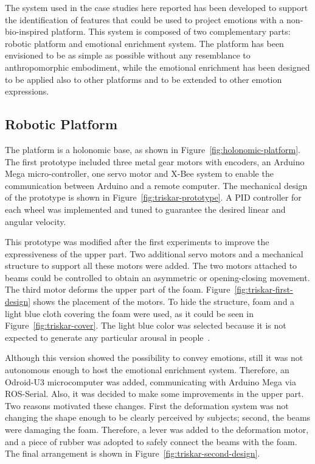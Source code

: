 The system used in the case studies here reported has been developed to support the identification of features that could be used to project emotions with a non-bio-inspired platform. This system is composed of two complementary parts: robotic platform and emotional enrichment system. The platform has been envisioned to be as simple as possible without any resemblance to anthropomorphic embodiment, while the emotional enrichment has been designed to be applied also to other platforms and to be extended to other emotion expressions.
 
\subsection{Robotic Platform}
The platform is a holonomic base, as shown in Figure~\ref{fig:holonomic-platform}. The first prototype included three metal gear motors with encoders, an Arduino Mega micro-controller, one servo motor and X-Bee system to enable the communication between Arduino and a remote computer. The mechanical design of the prototype is shown in Figure~\ref{fig:triskar-prototype}. A PID controller for each wheel was implemented and tuned to guarantee the desired linear and angular velocity.

This prototype was modified after the first experiments to improve the expressiveness of the upper part. Two additional servo motors and a mechanical structure to support all these motors were added. The two motors attached to beams could be controlled to obtain an asymmetric or opening-closing movement. 
The third motor deforms the upper part of the foam. Figure~\ref{fig:triskar-first-design} shows the placement of the motors. To hide the structure, foam and a light blue cloth covering the foam were used, as it could be seen in Figure~\ref{fig:triskar-cover}. The light blue color was selected because it is not expected to generate any particular arousal in people~\cite{Naz2012}. 

Although this version showed the possibility to convey emotions, still it was not autonomous enough to host the emotional enrichment system. Therefore, an Odroid-U3 microcomputer was added, communicating with Arduino Mega via ROS-Serial.
Also, it was decided to make some improvements in the upper part. Two reasons motivated these changes. First the deformation system was not changing the shape enough to be clearly perceived by subjects; second, the beams were damaging the foam. Therefore, a lever was added to the deformation motor, and a piece of rubber was adopted to safely connect the beams with the foam. The final arrangement is shown in Figure~\ref{fig:triskar-second-design}.
 
